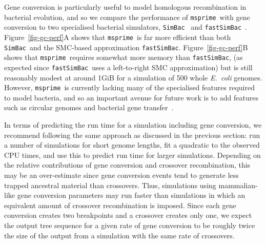 \documentclass{article}
\newcommand{\msprime}[0]{\texttt{msprime}}
\newcommand{\SimBac}[0]{\texttt{SimBac}}
\newcommand{\FastSimBac}[0]{\texttt{fastSimBac}}
\begin{document}
Gene conversion is particularly useful to model homologous recombination in
bacterial evolution,
and so we compare the performance of \msprime\ with gene conversion to
two specialised bacterial simulators,
\SimBac~\citep{brown2016simbac} and \FastSimBac~\citep{demaio2017the}.
Figure~\ref{fig-gc-perf}A shows that \msprime\ is far more efficient than
both \SimBac\ and the SMC-based approximation \FastSimBac.
Figure~\ref{fig-gc-perf}B shows that \msprime\ requires somewhat more memory
than \FastSimBac, (as expected since \FastSimBac\ uses a left-to-right
SMC approximation) but is still reasonably modest at around 1GiB for a simulation
of 500 whole \emph{E.~coli} genomes.
However, \msprime\ is currently lacking many of the specialised features
required to model bacteria, and so an important avenue for future work
is to add features such as circular genomes
and bacterial gene transfer~\citep{baumdicker2014AGTG}.

In terms of predicting the run time for a simulation including gene conversion,
we recommend following the same approach as discussed in the previous section:
run a number of simulations for short genome lengths, fit a quadratic to the
observed CPU times, and use this to predict run time for larger simulations.
Depending on the relative contributions of gene conversion and crossover
recombination, this may be an over-estimate since gene conversion events
tend to generate less trapped ancestral material than crossovers.
Thus, simulations using mammalian-like gene conversion parameters
may run faster than simulations in which an equivalent amount of
crossover recombination is imposed.
Since each gene conversion creates two breakpoints and a crossover
creates only one, we expect the output tree sequence for a given rate
of gene conversion to be roughly twice the size of the output from a simulation
with the same rate of crossovers.
\end{document}
